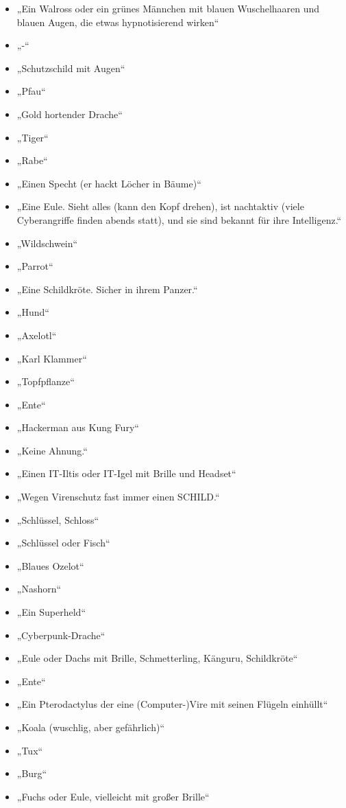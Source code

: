 \documentclass[german,report]{i1thesis}
\begin{document}
\begin{itemize}
    \item „Ein Walross oder ein grünes Männchen mit blauen Wuschelhaaren und blauen Augen, die etwas hypnotisierend wirken“
    \item „-“
    \item „Schutzschild mit Augen“
    \item „Pfau“
    \item „Gold hortender Drache“
    \item „Tiger“
    \item „Rabe“
    \item „Einen Specht (er hackt Löcher in Bäume)“
    \item „Eine Eule. Sieht alles (kann den Kopf drehen), ist nachtaktiv (viele Cyberangriffe finden abends statt), und sie sind bekannt für ihre Intelligenz.“
    \item „Wildschwein“
    \item „Parrot“
    \item „Eine Schildkröte. Sicher in ihrem Panzer.“
    \item „Hund“
    \item „Axelotl“
    \item „Karl Klammer“
    \item „Topfpflanze“
    \item „Ente“
    \item „Hackerman aus Kung Fury“
    \item „Keine Ahnung.“
    \item „Einen IT-Iltis oder IT-Igel mit Brille und Headset“
    \item „Wegen Virenschutz fast immer einen SCHILD.“
    \item „Schlüssel, Schloss“
    \item „Schlüssel oder Fisch“
    \item „Blaues Ozelot“
    \item „Nashorn“
    \item „Ein Superheld“
    \item „Cyberpunk-Drache“
    \item „Eule oder Dachs mit Brille, Schmetterling, Känguru, Schildkröte“
    \item „Ente“
    \item „Ein Pterodactylus der eine (Computer-)Vire mit seinen Flügeln einhüllt“
    \item „Koala (wuschlig, aber gefährlich)“
    \item „Tux“
    \item „Burg“
    \item „Fuchs oder Eule, vielleicht mit großer Brille“

\end{itemize}
\end{document}
